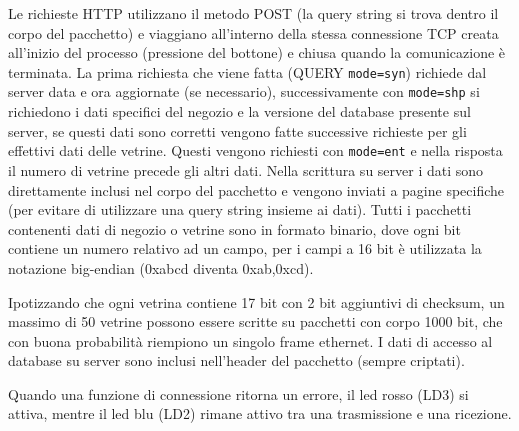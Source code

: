 Le richieste HTTP utilizzano il metodo POST (la query string si trova dentro il corpo del pacchetto) e viaggiano all'interno della stessa connessione TCP creata all'inizio del processo (pressione del bottone) e chiusa quando la comunicazione \`e terminata. La prima richiesta che viene fatta (QUERY \texttt{mode=syn}) richiede dal server data e ora aggiornate (se necessario), successivamente con \texttt{mode=shp} si richiedono i dati specifici del negozio e la versione del database presente sul server, se questi dati sono corretti vengono fatte successive richieste per gli effettivi dati delle vetrine. Questi vengono richiesti con \texttt{mode=ent} e nella risposta il numero di vetrine precede gli altri dati. Nella scrittura su server i dati sono direttamente inclusi nel corpo del pacchetto e vengono inviati a pagine specifiche (per evitare di utilizzare una query string insieme ai dati). Tutti i pacchetti contenenti dati di negozio o vetrine sono in formato binario, dove ogni bit contiene un numero relativo ad un campo, per i campi a 16 bit \`e utilizzata la notazione big-endian (0xabcd diventa 0xab,0xcd). 

Ipotizzando che ogni vetrina contiene 17 bit con 2 bit aggiuntivi di checksum, un massimo di 50 vetrine possono essere scritte su pacchetti con corpo 1000 bit, che con buona probabilit\`a riempiono un singolo frame ethernet. I dati di accesso al database su server sono inclusi nell'header del pacchetto (sempre criptati).

Quando una funzione di connessione ritorna un errore, il led rosso (LD3) si attiva, mentre il led blu (LD2) rimane attivo tra una trasmissione e una ricezione.

